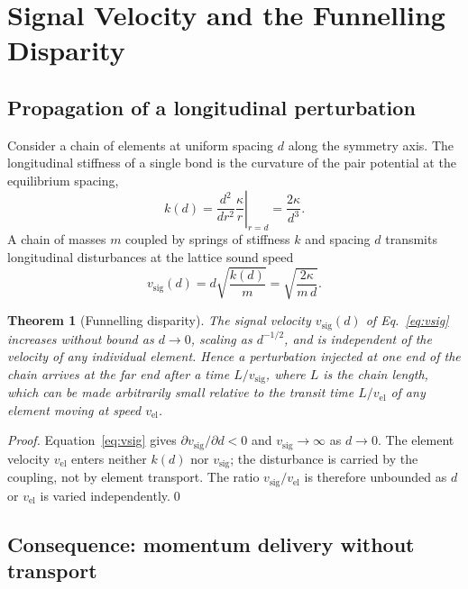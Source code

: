 \documentclass[twocolumn,10pt,a4paper]{article}
\theoremstyle{thmstyle}
\newtheorem{theorem}{Theorem}[section]
\theoremstyle{definition}
\theoremstyle{remark}
\newcommand{\vsig}{v_{\mathrm{sig}}}
\newcommand{\vnode}{v_{\mathrm{el}}}
\begin{document}
\section{Signal Velocity and the Funnelling Disparity}
\label{sec:signal}

\subsection{Propagation of a longitudinal perturbation}

Consider a chain of elements at uniform spacing $d$ along the symmetry axis.
The longitudinal stiffness of a single bond is the curvature of the pair
potential at the equilibrium spacing,
\begin{equation}
k(d) = \left.\frac{d^2}{dr^2}\frac{\kappa}{r}\right|_{r=d}
     = \frac{2\kappa}{d^3}.
\label{eq:stiffness}
\end{equation}
A chain of masses $m$ coupled by springs of stiffness $k$ and spacing $d$
transmits longitudinal disturbances at the lattice sound speed
\citep{ashcroft1976,toda1967}
\begin{equation}
\vsig(d) = d\sqrt{\frac{k(d)}{m}}
         = \sqrt{\frac{2\kappa}{m\,d}}.
\label{eq:vsig}
\end{equation}

\begin{theorem}[Funnelling disparity]
\label{thm:disparity}
The signal velocity $\vsig(d)$ of Eq.~\eqref{eq:vsig} increases without bound
as $d\to 0$, scaling as $d^{-1/2}$, and is independent of the velocity of any
individual element. Hence a perturbation injected at one end of the chain
arrives at the far end after a time $L/\vsig$, where $L$ is the chain length,
which can be made arbitrarily small relative to the transit time $L/\vnode$
of any element moving at speed $\vnode$.
\end{theorem}

\begin{proof}
Equation~\eqref{eq:vsig} gives $\partial \vsig/\partial d<0$ and
$\vsig\to\infty$ as $d\to0$. The element velocity $\vnode$ enters neither
$k(d)$ nor $\vsig$; the disturbance is carried by the coupling, not by element
transport. The ratio $\vsig/\vnode$ is therefore unbounded as $d$ or $\vnode$
is varied independently.\qed
\end{proof}

\subsection{Consequence: momentum delivery without transport}
\end{document}
